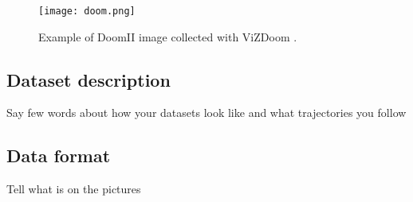 \begin{figure}
\centering
\texttt{[image: doom.png]} %
\caption{Example of DoomII image collected with ViZDoom \cite{Kempka2016}.}
\label{fig:doom}
\end{figure}

\subsection{Dataset description}

Say few words about how your datasets look like and what trajectories you follow

\subsection{Data format}

Tell what is on the pictures
